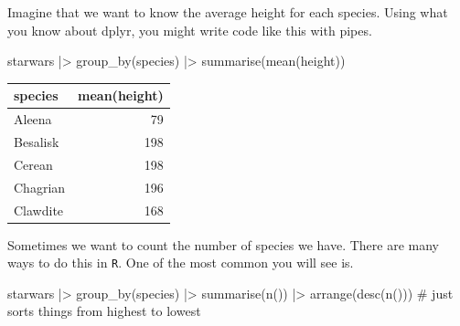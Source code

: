 \documentclass[
  letterpaper,
  DIV=11,
  numbers=noendperiod,
  oneside]{scrreprt}
\newenvironment{Shaded}{\begin{snugshade}}{\end{snugshade}}
\newcommand{\AttributeTok}[1]{\textcolor[rgb]{0.40,0.45,0.13}{#1}}
\newcommand{\CommentTok}[1]{\textcolor[rgb]{0.37,0.37,0.37}{#1}}
\newcommand{\FunctionTok}[1]{\textcolor[rgb]{0.28,0.35,0.67}{#1}}
\newcommand{\NormalTok}[1]{\textcolor[rgb]{0.00,0.23,0.31}{#1}}
\newcommand{\SpecialCharTok}[1]{\textcolor[rgb]{0.37,0.37,0.37}{#1}}
\newcommand{\StringTok}[1]{\textcolor[rgb]{0.13,0.47,0.30}{#1}}
\begin{document}

Imagine that we want to know the average height for each species. Using
what you know about dplyr, you might write code like this with pipes.

\begin{Shaded}
\begin{Highlighting}[]
\NormalTok{starwars }\SpecialCharTok{|\textgreater{}}
\FunctionTok{group\_by}\NormalTok{(species) }\SpecialCharTok{|\textgreater{}}
\FunctionTok{summarise}\NormalTok{(}\FunctionTok{mean}\NormalTok{(height))}
\end{Highlighting}
\end{Shaded}

\begin{tabular}{l|r}
\hline
species & mean(height)\\
\hline
Aleena & 79\\
\hline
Besalisk & 198\\
\hline
Cerean & 198\\
\hline
Chagrian & 196\\
\hline
Clawdite & 168\\
\hline
\end{tabular}

Sometimes we want to count the number of species we have. There are many
ways to do this in \texttt{R}. One of the most common you will see is.

\begin{Shaded}
\begin{Highlighting}[]
\NormalTok{starwars }\SpecialCharTok{|\textgreater{}}
\FunctionTok{group\_by}\NormalTok{(species) }\SpecialCharTok{|\textgreater{}}
\FunctionTok{summarise}\NormalTok{(}\FunctionTok{n}\NormalTok{()) }\SpecialCharTok{|\textgreater{}}
\FunctionTok{arrange}\NormalTok{(}\FunctionTok{desc}\NormalTok{(}\StringTok{\textasciigrave{}}\AttributeTok{n()}\StringTok{\textasciigrave{}}\NormalTok{))  }\CommentTok{\# just sorts things from highest to lowest}
\end{Highlighting}
\end{Shaded}
\end{document}
